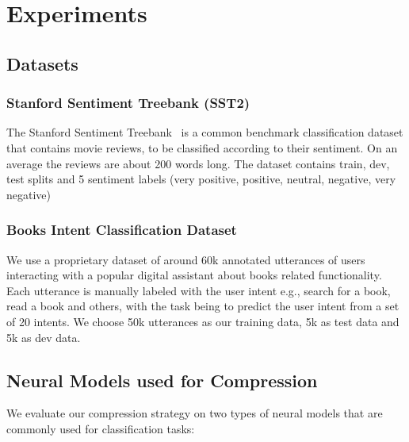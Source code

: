 \section{Experiments} 
\label{sec:experiment}
\subsection{Datasets}
\subsubsection{Stanford Sentiment Treebank (SST2)}
The Stanford Sentiment Treebank~\cite{socher2013recursive} is a common benchmark classification dataset that contains movie reviews, to be classified according to their sentiment. On an average the reviews are about 200 words long. The dataset contains train, dev, test splits and 5 sentiment labels (very positive, positive, neutral, negative, very negative) 
\subsubsection{Books Intent Classification Dataset}
We use a proprietary dataset of around 60k annotated utterances of users interacting with a popular digital assistant about books related functionality. Each utterance is manually labeled with the user intent e.g., search for a book, read a book and others, with the task being to predict the user intent from a set of 20 intents. We choose 50k utterances as our training data, 5k as test data and 5k as dev data.
\subsection{Neural Models used for Compression}
We evaluate our compression strategy on two types of neural models that are commonly used for classification tasks:
